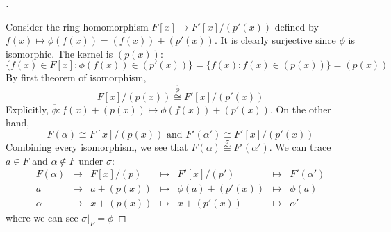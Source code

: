 \documentclass[12pt]{article}
\theoremstyle{definition}
\newtheorem{thm}{Theorem}
\newenvironment{proofs}[1][\proofname]{%
  \begin{proof}[#1]$ $\par\nobreak\ignorespaces
}{%
  \end{proof}
}
\begin{document}
\begin{proofs}
	Consider the ring homomorphism $F[x]\to F'[x]/(p'(x))$ defined by $f(x)\mapsto \overline{\phi(f(x))}=(f(x))+(p'(x))$. It is clearly surjective since $\phi$ is isomorphic. The kernel is $(p(x))$:
	\[\{f(x)\in F[x]: \phi(f(x))\in (p'(x))\}=\{f(x): f(x)\in (p(x))\}=(p(x))\]
	By first theorem of isomorphism,
	\[F[x]/(p(x))\overset{\overline{\phi}}{\cong} F'[x]/(p'(x))\]
	Explicitly, $\overline{\phi}: f(x)+(p(x))\mapsto \phi(f(x))+(p'(x))$. On the other hand,
	\[F(\alpha)\cong F[x]/(p(x)) \text{ and } F'(\alpha')\cong F'[x]/(p'(x))\]
	Combining every isomorphism, we see that $F(\alpha)\overset{\sigma}{\cong}F'(\alpha')$.
	We can trace $a\in F$ and $\alpha \notin F$ under $\sigma$:
	\[\begin{matrix}
			F(\alpha) & \mapsto & F[x]/(p) & \mapsto & F'[x]/(p')        & \mapsto & F'(\alpha') \\
			a         & \mapsto & a+(p(x)) & \mapsto & \phi(a) + (p'(x)) & \mapsto & \phi(a)     \\
			\alpha    & \mapsto & x+(p(x)) & \mapsto & x + (p'(x))       & \mapsto & \alpha'
		\end{matrix} \]
	where we can see $\sigma|_F=\phi$
\end{proofs}





\end{document}
